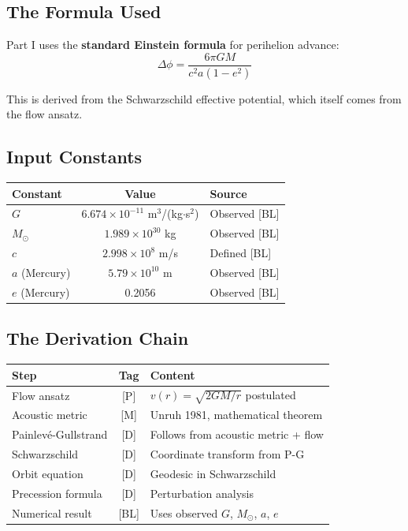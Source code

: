 \documentclass[11pt,a4paper]{article}
\begin{document}
\subsection{The Formula Used}

Part I uses the \textbf{standard Einstein formula} for perihelion advance:
\begin{equation}
\Delta\phi = \frac{6\pi GM}{c^2 a(1-e^2)}
\label{eq:precession}
\end{equation}

This is derived from the Schwarzschild effective potential, which itself comes from the flow ansatz.

\subsection{Input Constants}

\begin{center}
\begin{tabular}{|l|c|l|}
\hline
\textbf{Constant} & \textbf{Value} & \textbf{Source} \\
\hline
$G$ & $6.674 \times 10^{-11}$ m$^3$/(kg$\cdot$s$^2$) & Observed [BL] \\
$M_\odot$ & $1.989 \times 10^{30}$ kg & Observed [BL] \\
$c$ & $2.998 \times 10^8$ m/s & Defined [BL] \\
$a$ (Mercury) & $5.79 \times 10^{10}$ m & Observed [BL] \\
$e$ (Mercury) & 0.2056 & Observed [BL] \\
\hline
\end{tabular}
\end{center}

\subsection{The Derivation Chain}

\begin{center}
\begin{tabular}{|l|c|l|}
\hline
\textbf{Step} & \textbf{Tag} & \textbf{Content} \\
\hline
Flow ansatz & [P] & $v(r) = \sqrt{2GM/r}$ postulated \\
Acoustic metric & [M] & Unruh 1981, mathematical theorem \\
Painlev\'e-Gullstrand & [D] & Follows from acoustic metric + flow \\
Schwarzschild & [D] & Coordinate transform from P-G \\
Orbit equation & [D] & Geodesic in Schwarzschild \\
Precession formula & [D] & Perturbation analysis \\
Numerical result & [BL] & Uses observed $G$, $M_\odot$, $a$, $e$ \\
\hline
\end{tabular}
\end{center}
\end{document}
